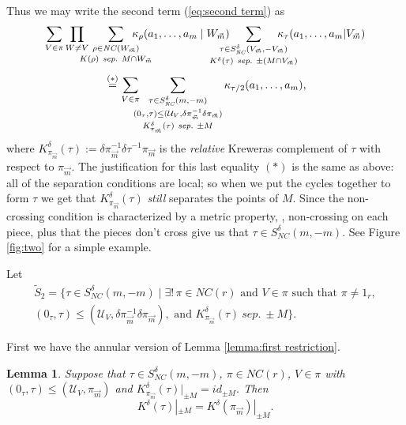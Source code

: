 \documentclass[11pt]{amsart}
\newtheorem{lemma}[theorem]{Lemma}
\theoremstyle{definition}
\numberwithin{theorem}{section}
\newcommand{\cU}{\mathcal{U}}
\newcommand{\sM}{{\scriptscriptstyle M}}
\newcommand{\sV}{{\scriptscriptstyle V}}
\newcommand{\NC}{\mathit{NC}}
\newcommand{\vm}{{\vec{m}}}
\newcommand{\sep}{\mathit{\ sep.\ }}
\newcommand*{\vv}[1]{\vec{\mkern0mu#1}}
\newcommand{\id}{\mathit{id}}
\newcommand{\ab}{\allowbreak}
\begin{document}
Thus we may write the second term (\ref{eq:second term}) as
\[
\sum_{V \in \pi}
\prod_{W \not=V} \kern-1.0em
\mathop{\sum_{\rho \in \NC(W_{\vv m})}}_{K(\rho) \sep M \cap W_{\vv m}}
\kern-2em
\kappa_\rho(a_1, \dots, a_m \mid W_{\vv m}) \kern-2em
\mathop{\sum_{\tau \in S_\NC^\delta(V_{\vv m}, -V_{\vv m})}}
_{K^\delta(\tau) \sep \pm(M \cap V_\vm)} 
\kern-2em
\kappa_{\tau}(a_1, \dots, a_m | V_{\vv m})
\] 
\[
\mbox{}\stackrel{(*)}{=}
\sum_{V \in \pi} \kern-0.75em \mathop{\mathop{\sum_{\tau \in S_\NC^\delta(m, -m)}}_
{(0_\tau, \tau) \leq (\cU_\sV, \delta\pi_\vm^{-1} \delta \pi_\vm)}}_
{K^\delta_{\pi_{\vv m}}(\tau) \sep \pm M}
\kappa_{\tau/2}(a_1, \dots, a_m),
\]
where $K^\delta_{\pi_\vm}(\tau) := \delta \pi_\vm^{-1}
\delta \tau^{-1} \pi_\vm$ is the \textit{relative} Kreweras
complement of $\tau$ with respect to $\pi_\vm$. The
justification for this last equality $(*)$ is the same as
above: all of the separation conditions are local; so when
we put the cycles together to form $\tau$ we get that
$K^\delta_{\pi_\vm}(\tau)$ \textit{still} separates the
points of $M$. Since the non-crossing condition is
characterized by a metric property, \cite[Notation 4]{mst},
non-crossing on each piece, plus that the pieces don't cross
give us that $\tau \in S_\NC^\delta(m, -m)$. See Figure
\ref{fig:two} for a simple example.

\medskip\noindent
Let
\begin{multline*}
\tilde{S}_2 = 
\{ \tau \in S_\NC^\delta(m, -m) \mid \exists!\,
\pi \in \NC(r) \mbox{\ and\ } V \in \pi
\mbox{\ such that\ } \pi \not = 1_r,\\
(0_\tau, \tau) \leq (\cU_\sV, \delta\pi_\vm^{-1} \delta \pi_\vm),  
 \mbox{\ and\ } 
K_{\pi_\vm}^\delta(\tau) \sep \pm M\}.
\end{multline*}


First we have the annular version of Lemma \ref{lemma:first
  restriction}.

\begin{lemma}\label{lemma:annular restrictions}
Suppose that $\tau \in S_\NC^\delta(m, -m)$, $\pi \in
\NC(r)$, $V \in \pi$ with $(0_\tau, \tau) \leq (\cU_\sV,
\pi_\vm)$ and $K_{\pi_\vm}^\delta(\tau)|_{\pm \sM} =
\id_{\pm \sM}$. Then \[ K^\delta(\tau)|_{\pm \sM} = \ab
K^\delta(\pi_\vm) |_{\pm \sM}.\]
\end{lemma}
\end{document}
